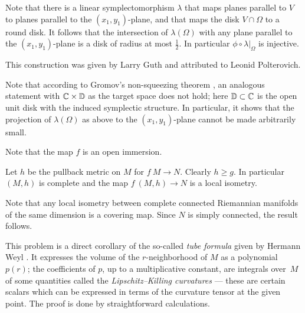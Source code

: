 Note that there is a linear symplectomorphism $\lambda$ that maps planes parallel to $V$ to planes parallel to the $(x_1,y_1)$-plane, and that maps the disk $V\cap\Omega$ to a round disk.
It follows that the intersection of $\lambda(\Omega)$ 
with any plane parallel to the $(x_1,y_1)$-plane is a disk of radius at most $\tfrac 12$.
In particular $\phi\circ\lambda|_\Omega$
is injective.\qeds

This construction was given 
by Larry Guth \cite{guth-symplectic}
and attributed to Leonid Polterovich.

Note that according to Gromov's non-squeezing theorem \cite{gromov-pseudoholomorphic}, 
an analogous statement with $\mathbb{C}\times \mathbb{D}$ as the target space does not hold;
here $\mathbb{D}\subset \mathbb{C}$ is the open unit disk with the induced symplectic structure.
In particular, it shows that
the projection of $\lambda(\Omega)$ as above 
to the $(x_1,y_1)$-plane
cannot be made arbitrarily small.

Note that the map $f$ is an open immersion.

Let $h$ be the pullback metric on $M$ for $f\:M\to N$.
Clearly $h\ge g$.
In particular $(M,h)$ is complete and the map $f\:(M,h)\to N$ is a local isometry. 

Note that any local isometry between complete connected Riemannian manifolds of the same dimension is a covering map.
Since $N$ is simply connected, the result follows.
\qeds 


This problem is a direct corollary of the so-called \emph{tube formula} given by Hermann Weyl \cite{weyl}.
It expresses the volume of the $r$-neighborhood of $M$ as a polynomial $p(r)$;
the coefficients of $p$, up to a multiplicative constant, are integrals over~$M$ of some quantities called the \emph{Lipschitz--Killing curvatures} --- these are certain scalars which can be expressed in terms of the curvature tensor at the given point.
The proof is done by straightforward calculations.

 


